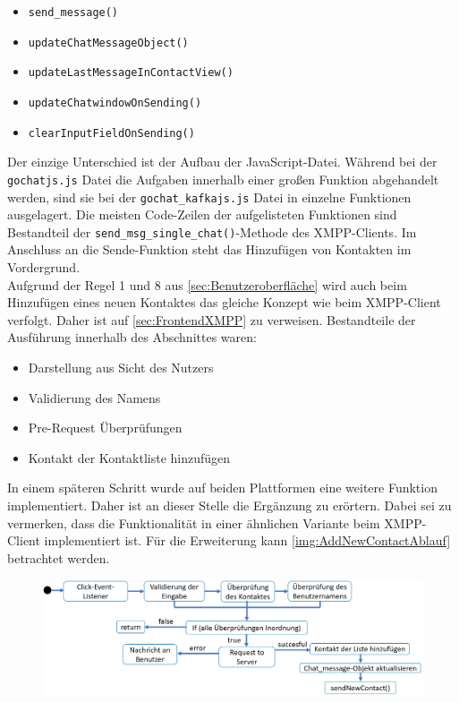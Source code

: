 \documentclass[a4paper,titlepage,halfparskip,12pt]{scrreprt}
\begin{document}
\begin{onehalfspacing}
\begin{itemize}
	\item \texttt{send\_message()}
	\item \texttt{updateChatMessageObject()}
	\item \texttt{updateLastMessageInContactView()}
	\item \texttt{updateChatwindowOnSending()}
	\item \texttt{clearInputFieldOnSending()}
\end{itemize}
Der einzige Unterschied ist der Aufbau der JavaScript-Datei. Während bei der \texttt{gochatjs.js} Datei die Aufgaben innerhalb einer großen Funktion abgehandelt werden, sind sie bei der \texttt{gochat\_kafkajs.js} Datei in einzelne Funktionen ausgelagert. Die meisten Code-Zeilen der aufgelisteten Funktionen sind Bestandteil der \texttt{send\_msg\_single\_chat()}-Methode des XMPP-Clients. Im Anschluss an die Sende-Funktion steht das Hinzufügen von Kontakten im Vordergrund.\\
Aufgrund der Regel 1 und 8 aus \autoref{sec:Benutzeroberfläche} wird auch beim Hinzufügen eines neuen Kontaktes das gleiche Konzept wie beim XMPP-Client verfolgt. Daher ist auf \autoref{sec:FrontendXMPP} zu verweisen. Bestandteile der Ausführung innerhalb des Abschnittes waren:
\begin{itemize}
	\item Darstellung aus Sicht des Nutzers
	\item Validierung des Namens
	\item Pre-Request Überprüfungen
	\item Kontakt der Kontaktliste hinzufügen
\end{itemize}
In einem späteren Schritt wurde auf beiden Plattformen eine weitere Funktion implementiert. Daher ist an dieser Stelle die Ergänzung zu erörtern. Dabei sei zu vermerken, dass die Funktionalität in einer ähnlichen Variante beim XMPP-Client implementiert ist. Für die Erweiterung kann \autoref{img:AddNewContactAblauf} betrachtet werden.
\begin{figure}[h]
	\centering
	\includegraphics[scale=0.53]{images/AddNewContactAblauf}

\end{figure}
\end{onehalfspacing}
\end{document}

